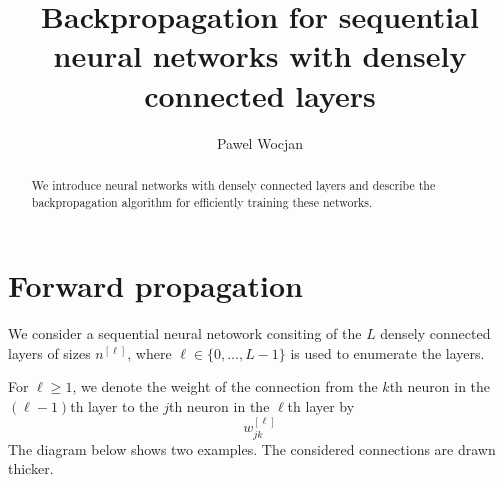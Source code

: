 \documentclass[12pt]{article}
\title{Backpropagation for sequential neural networks with densely connected layers}
\author{Pawel Wocjan}
\begin{document}
\maketitle


\begin{abstract}
We introduce neural networks with densely connected layers and describe the backpropagation algorithm for efficiently training these networks.
\end{abstract}

\section{Forward propagation}
We consider a sequential neural netowork consiting of the $L$ densely connected layers of sizes $n^{[\ell]}$, where $\ell\in\{0,\ldots,L-1\}$ is used to enumerate the layers.

For $\ell \ge 1$, we denote the weight of the connection from the $k$th neuron in the $(\ell - 1)$th layer to the $j$th neuron in the $\ell$th layer by
\begin{equation}
w^{[\ell]}_{jk}
\end{equation}
The diagram below shows two examples. The considered connections are drawn thicker.

\end{document}
